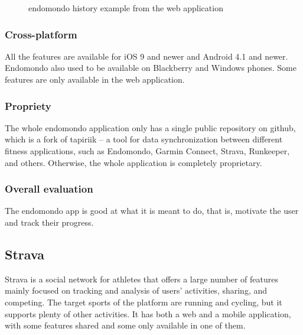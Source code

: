 \begin{figure}[htb!]
    \centering
        \caption{endomondo history example from the web application \cite{endomondo-history-img}}
\end{figure}

\subsubsection*{Cross-platform}
All the features are available for iOS 9 and newer and Android 4.1 and newer.
Endomondo also used to be available on Blackberry and Windows phones.
Some features are only available in the web application.
\subsubsection*{Propriety}
The whole endomondo application only has a single public repository on github, which is a fork of tapiriik -- a tool for data synchronization between different fitness applications, such as Endomondo, Garmin Connect, Strava, Runkeeper, and others. \cite{endomondo-tapiriik}
Otherwise, the whole application is completely proprietary.
\subsubsection*{Overall evaluation}
The endomondo app is good at what it is meant to do, that is, motivate the user and track their progress.
\pagebreak
\pagebreak
\subsection{Strava}
Strava is a social network for athletes that offers a large number of features mainly focused on tracking and analysis of users' activities, sharing, and competing. \cite{strava}
The target sports of the platform are running and cycling, but it supports plenty of other activities.
It has both a web and a mobile application, with some features shared and some only available in one of them.
